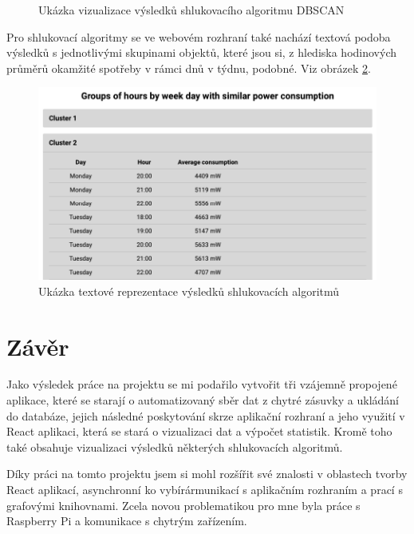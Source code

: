 \documentclass[czech,master,dept460,male,cpp,cpdeclaration,oneside]{diploma}
\begin{document}
\begin{itemize}
\begin{figure}[h!]
		\caption{Ukázka vizualizace výsledků shlukovacího algoritmu DBSCAN}
		\label{fig:React3}
	\end{figure}
\end{itemize}

\pagebreak 

Pro shlukovací algoritmy se ve webovém rozhraní také nachází textová podoba výsledků s jednotlivými skupinami objektů, které jsou si, z hlediska hodinových průměrů okamžité spotřeby v rámci dnů v týdnu, podobné. Viz obrázek \ref{fig:React4}.

\begin{figure}[h!]
	\centering
	\includegraphics[width=1\textwidth]{Figures/React4.png}
	\caption{Ukázka textové reprezentace výsledků shlukovacích algoritmů}
	\label{fig:React4}
\end{figure}

\pagebreak
\section{Závěr}
Jako výsledek práce na projektu se mi podařilo vytvořit tři vzájemně propojené aplikace, které se starají o automatizovaný sběr dat z chytré zásuvky a ukládání do databáze, jejich následné poskytování skrze aplikační rozhraní a jeho využití v React aplikaci, která se stará o vizualizaci dat a výpočet statistik. Kromě toho také obsahuje vizualizaci výsledků některých shlukovacích algoritmů.

Díky práci na tomto projektu jsem si mohl rozšířit své znalosti v oblastech tvorby React aplikací, asynchronní ko vybírármunikací s aplikačním rozhraním a prací s grafovými knihovnami. Zcela novou problematikou pro mne byla práce s Raspberry Pi a komunikace s chytrým zařízením.

\clearpage

\nocite{*}
\printbibliography[title={Literatura}, heading=bibintoc]
\end{document}
